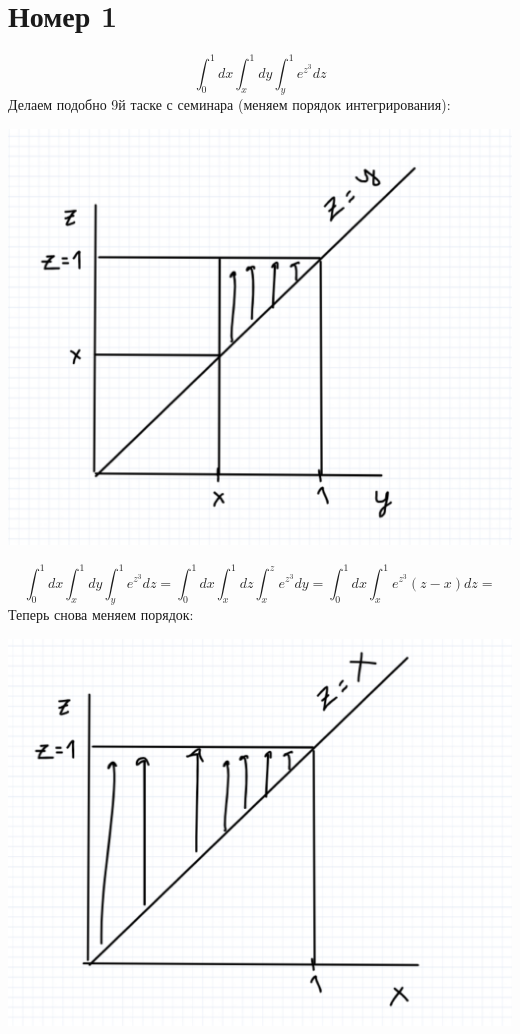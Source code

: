 \documentclass[a4paper,12pt]{article}
\author{Бурмашев Григорий, БПМИ-208}
\title{}
\date{\today}
\begin{document}
\maketitle
\clearpage
\section*{Номер 1}
\[
\int_0^1 dx \int_x^1 dy \int_y^1 e^{z^3} dz 
\]
Делаем подобно 9й таске с семинара (меняем порядок интегрирования):
\begin{center}
\includegraphics[scale=0.2]{1.png}
\end{center}
\[
\int_0^1 dx \int_x^1 dy \int_y^1 e^{z^3} dz  = \int_0^1 dx \int_x^1 dz \int_x^z e^{z^3} dy =  \int_0^1 dx \int_x^1 e^{z^3} (z - x) dz =
\]
Теперь снова меняем порядок:
\begin{center}
\includegraphics[scale=0.2]{2.png}
\end{center}
\end{document}
